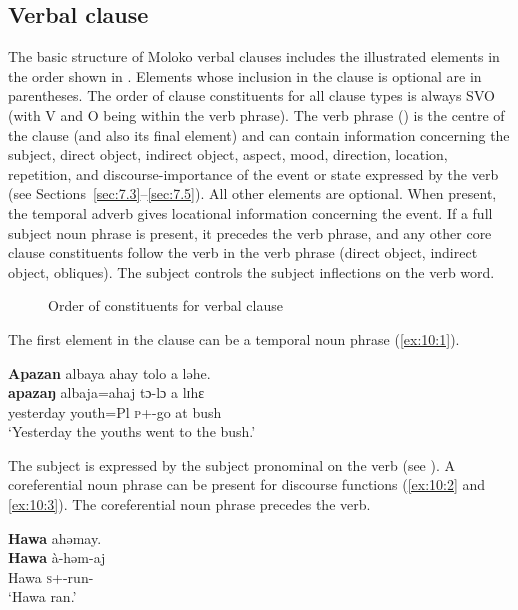 \subsection{Verbal clause}\label{sec:10.1.1}
\hypertarget{RefHeading1212861525720847}{}
The basic structure of Moloko verbal clauses includes the illustrated elements in the order shown in . Elements whose inclusion in the clause is optional are in parentheses. The order of clause constituents for all clause types is always SVO (with V and O being within the verb phrase). The verb phrase () is the centre of the clause (and also its final element) and can contain information concerning the subject, direct object, indirect object, aspect, mood, direction, location, repetition, and discourse-importance of the event or state expressed by the verb (see Sections~\ref{sec:7.3}--\ref{sec:7.5}). All other elements are optional. When present, the temporal adverb gives locational information concerning the event. If a full subject noun phrase is present, it precedes the verb phrase, and any other core clause constituents follow the verb in the verb phrase (direct object, indirect object, obliques). The subject controls the subject inflections on the verb word. 
  
\begin{figure}
\caption{Order of constituents for verbal clause\label{fig:16}}
\end{figure}

The first element in the clause can be a temporal noun phrase (\ref{ex:10:1}).

\ea \label{ex:10:1}
\textbf{Apazan} albaya  ahay  tolo  a  ləhe.\\
\gll  \textbf{apazaŋ}  albaja=ahaj    tɔ-lɔ    a  lɪhɛ\\
      yesterday  youth=Pl      \textsc{p}+{\PFV}-go  at  bush\\
\glt  ‘Yesterday the youths went to the bush.’ 
\z

The subject is expressed by the subject pronominal on the verb (see ). A coreferential noun phrase can be present for discourse functions (\ref{ex:10:2} and \ref{ex:10:3}). The coreferential noun phrase precedes the verb.  

\ea \label{ex:10:2}
\textbf{Hawa}  ahəmay.\\
\gll  \textbf{Hawa}   à-həm-aj\\
      Hawa  \textsc{s}+{\PFV}-run{}-{\CL}\\
\glt  ‘Hawa ran.’
\z

